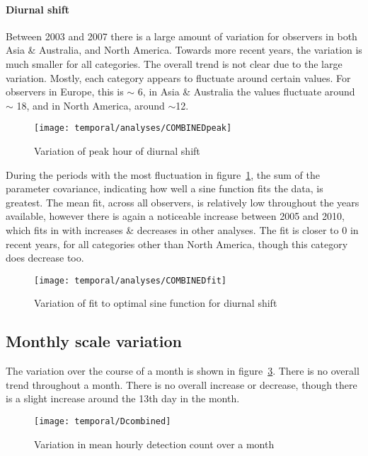 \paragraph{Diurnal shift\\}
Between 2003 and 2007 there is a large amount of variation for observers in both Asia \& Australia, and North America. Towards more recent years, the variation is much smaller for all categories. The overall trend is not clear due to the large variation. Mostly, each category appears to fluctuate around certain values. For observers in Europe, this is $\sim$ 6, in Asia \& Australia the values fluctuate around $\sim$ 18, and in North America, around $\sim$12.
\begin{figure}[h!]
	\centering
	\texttt{[image: temporal/analyses/COMBINEDpeak]}
	\caption{Variation of peak hour of diurnal shift
		\label{fig:temp:peak}}
\end{figure}
During the periods with the most fluctuation in figure~\ref{fig:temp:peak}, the sum of the parameter covariance, indicating how well a sine function fits the data, is greatest. The mean fit, across all observers, is relatively low throughout the years available, however there is again a noticeable increase between 2005 and 2010, which fits in with increases \& decreases in other analyses. The fit is closer to 0 in recent years, for all categories other than North America, though this category does decrease too.
\begin{figure}[h!]
	\centering
	\texttt{[image: temporal/analyses/COMBINEDfit]}
	\caption{Variation of fit to optimal sine function for diurnal shift
		\label{fig:temp:fit}}
\end{figure}

\subsection{Monthly scale variation}
The variation over the course of a month is shown in figure~\ref{fig:temp:day}. There is no overall trend throughout a month. There is no overall increase or decrease, though there is a slight increase around the 13th day in the month.
\begin{figure}[h!]
	\centering
	\texttt{[image: temporal/Dcombined]}
	\caption{Variation in mean hourly detection count over a month
		\label{fig:temp:day}}
\end{figure}
